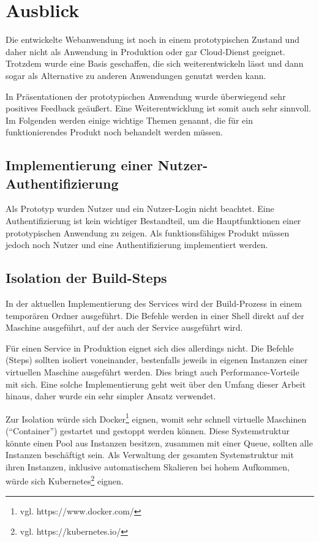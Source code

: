 \chapter{Ausblick}

Die entwickelte Webanwendung ist noch in einem prototypischen Zustand und daher nicht als Anwendung in Produktion oder gar Cloud-Dienst geeignet. Trotzdem wurde eine Basis geschaffen, die sich weiterentwickeln lässt und dann sogar als Alternative zu anderen Anwendungen genutzt werden kann.

In Präsentationen der prototypischen Anwendung wurde überwiegend sehr positives Feedback geäußert. Eine Weiterentwicklung ist somit auch sehr sinnvoll. Im Folgenden werden einige wichtige Themen genannt, die für ein funktionierendes Produkt noch behandelt werden müssen.

\section{Implementierung einer Nutzer-Authentifizierung}

Als Prototyp wurden Nutzer und ein Nutzer-Login nicht beachtet. Eine Authentifizierung ist kein wichtiger Bestandteil, um die Hauptfunktionen einer prototypischen Anwendung zu zeigen. Als funktionsfähiges Produkt müssen jedoch noch Nutzer und eine Authentifizierung implementiert werden.

\section{Isolation der Build-Steps}

In der aktuellen Implementierung des Services wird der Build-Prozess in einem temporären Ordner ausgeführt. Die Befehle werden in einer Shell direkt auf der Maschine ausgeführt, auf der auch der Service ausgeführt wird.

Für einen Service in Produktion eignet sich dies allerdings nicht. Die Befehle (Steps) sollten isoliert voneinander, bestenfalls jeweils in eigenen Instanzen einer virtuellen Maschine ausgeführt werden. Dies bringt auch Performance-Vorteile mit sich. Eine solche Implementierung geht weit über den Umfang dieser Arbeit hinaus, daher wurde ein sehr simpler Ansatz verwendet.

Zur Isolation würde sich Docker\footnote{vgl. https://www.docker.com/} eignen, womit sehr schnell virtuelle Maschinen (``Container'') gestartet und gestoppt werden können. Diese Systemstruktur könnte einen Pool aus Instanzen besitzen, zusammen mit einer Queue, sollten alle Instanzen beschäftigt sein. Als Verwaltung der gesamten Systemstruktur mit ihren Instanzen, inklusive automatischem Skalieren bei hohem Aufkommen, würde sich Kubernetes\footnote{vgl. https://kubernetes.io/} eignen.

